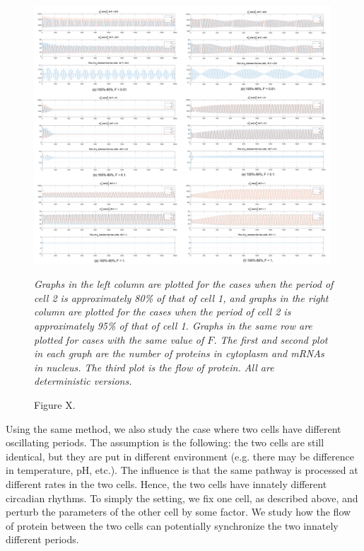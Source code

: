 \documentclass[12pt]{article}
\renewcommand{\(}{\left (}
\renewcommand{\)}{\right )}
\begin{document}
\begin{figure}[h]
    \centering
	\begin{minipage}{0.99\textwidth}
		\centering
		\includegraphics[width=0.99\textwidth]{diff_periods_combine.png}
		\caption*{\small Figure X.}
	\end{minipage}
	\footnotesize
	\emph{Graphs in the left column are plotted for the cases when the period of cell 2 is approximately 80\% of that of cell 1, and graphs in the right column are plotted for the cases when the period of cell 2 is approximately 95\% of that of cell 1. Graphs in the same row are plotted for cases with the same value of $F$. The first and second plot in each graph are the number of proteins in cytoplasm and mRNAs in nucleus. The third plot is the flow of protein. All are deterministic versions.}
\end{figure}

 Using the same method, we also study the case where two cells have different oscillating periods. The assumption is the following: the two cells are still identical, but they are put in different environment (e.g. there may be difference in temperature, pH, etc.). The influence is that the same pathway is processed at different rates in the two cells. Hence, the two cells have innately different circadian rhythms. To simply the setting, we fix one cell, as described above, and perturb the parameters of the other cell by some factor. We study how the flow of protein between the two cells can potentially synchronize the two innately different periods.
\end{document}
